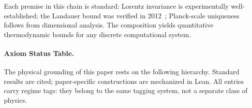 Each premise in this chain is standard: Lorentz invariance is experimentally well-established; the Landauer bound was verified in 2012~\cite{berut2012experimental}; Planck-scale uniqueness follows from dimensional analysis. The composition yields quantitative thermodynamic bounds for any discrete computational system.

\paragraph{Axiom Status Table.}
The physical grounding of this paper rests on the following hierarchy. Standard results are cited; paper-specific constructions are mechanized in Lean. All entries carry regime tags: they belong to the same tagging system, not a separate class of physics.

